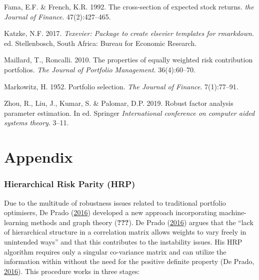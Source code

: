 \documentclass[11pt,preprint, authoryear]{elsarticle}
\numberwithin{equation}{section}
\numberwithin{figure}{section}
\numberwithin{table}{section}
\begin{document}
\leavevmode\hypertarget{ref-fama1992}{}%
Fama, E.F. \& French, K.R. 1992. The cross-section of expected stock
returns. \emph{the Journal of Finance}. 47(2):427--465.

\leavevmode\hypertarget{ref-Texevier}{}%
Katzke, N.F. 2017. \emph{Texevier: Package to create elsevier templates
for rmarkdown}. ed. Stellenbosch, South Africa: Bureau for Economic
Research.

\leavevmode\hypertarget{ref-maillard2010}{}%
Maillard, T., Roncalli. 2010. The properties of equally weighted risk
contribution portfolios. \emph{The Journal of Portfolio Management}.
36(4):60--70.

\leavevmode\hypertarget{ref-markowitz}{}%
Markowitz, H. 1952. Portfolio selection. \emph{The Journal of Finance}.
7(1):77--91.

\leavevmode\hypertarget{ref-zhou2019}{}%
Zhou, R., Liu, J., Kumar, S. \& Palomar, D.P. 2019. Robust factor
analysis parameter estimation. In ed. Springer \emph{International
conference on computer aided systems theory}. 3--11.

\newpage

\hypertarget{appendix}{%
\section*{Appendix}\label{appendix}}

\hypertarget{hierarchical-risk-parity-hrp}{%
\subsubsection{Hierarchical Risk Parity
(HRP)}\label{hierarchical-risk-parity-hrp}}

Due to the multitude of robustness issues related to traditional
portfolio optimisers, De Prado (\protect\hyperlink{ref-lopez}{2016})
developed a new approach incorporating machine-learning methods and
graph theory ({\textbf{???}}). De Prado
(\protect\hyperlink{ref-lopez}{2016}) argues that the ``lack of
hierarchical structure in a correlation matrix allows weights to vary
freely in unintended ways'' and that this contributes to the instability
issues. His HRP algorithm requires only a singular co-variance matrix
and can utilize the information within without the need for the positive
definite property (De Prado, \protect\hyperlink{ref-lopez}{2016}). This
procedure works in three stages:
\end{document}
